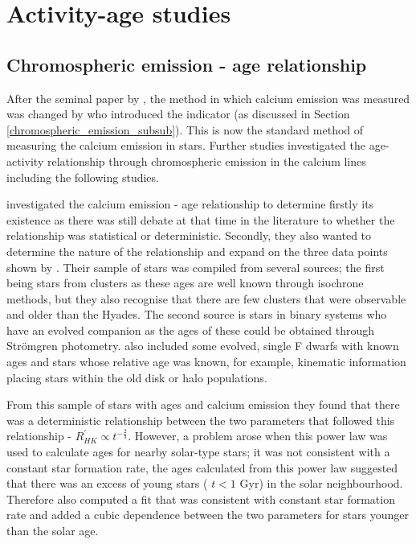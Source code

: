 \section{Activity-age studies}
\label{Chp2_section_activity_age}
\subsection{Chromospheric emission - age relationship}

After the seminal paper by \citet{Skumanich_1972}, the method in which calcium emission was measured was changed by \citet{Noyes_etal_1984} who introduced the \Rprime indicator (as discussed in Section \ref{chromospheric_emission_subsub}). This is now the standard method of measuring the calcium emission in stars. Further studies investigated the age-activity relationship through chromospheric emission in the calcium lines including the following studies.

\citet{Soderblom_etal_1991} investigated the calcium emission - age relationship to determine firstly its existence as there was still debate at that time in the literature to whether the relationship was statistical or deterministic. Secondly, they also wanted to determine the nature of the relationship and expand on the three data points shown by \citet{Skumanich_1972}. Their sample of stars was compiled from several sources; the first being stars from clusters as these ages are well known through isochrone methods, but they also recognise that there are few clusters that were observable and older than the Hyades. The second source is stars in binary systems who have an evolved companion as the ages of these could be obtained through Str\"{o}mgren photometry. \citet{Soderblom_etal_1991} also included some evolved, single F dwarfs with known ages and stars whose relative age was known, for example, kinematic information placing stars within the old disk or halo populations.

From this sample of stars with ages and calcium emission they found that there was a deterministic relationship between the two parameters that followed this relationship - $R^{'}_{HK} \propto t^{-\frac{2}{3}}$. However, a problem arose when this power law was used to calculate ages for nearby solar-type stars; it was not consistent with a constant star formation rate, the ages calculated from this power law suggested that there was an excess of young stars ( $t < 1$ Gyr) in the solar neighbourhood. Therefore \citet{Soderblom_etal_1991} also computed a fit that was consistent with constant star formation rate and added a cubic dependence between the two parameters for stars younger than the solar age.

